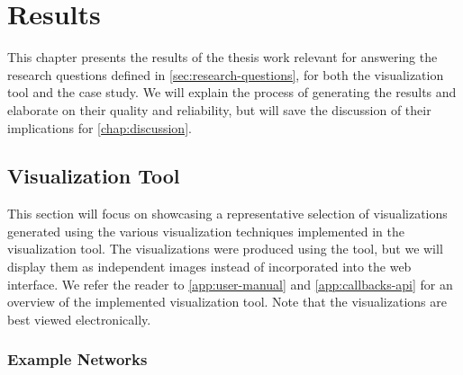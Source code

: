 
\chapter{Results} \label{chap:results}

This chapter presents the results of the thesis work relevant for answering the research questions defined in \autoref{sec:research-questions}, for both the visualization tool and the case study. We will explain the process of generating the results and elaborate on their quality and reliability, but will save the discussion of their implications for \autoref{chap:discussion}.

\section{Visualization Tool} \label{sec:visualization-tool-results}

This section will focus on showcasing a representative selection of visualizations generated using the various visualization techniques implemented in the visualization tool. The visualizations were produced using the tool, but we will display them as independent images instead of incorporated into the web interface. We refer the reader to \autoref{app:user-manual} and \autoref{app:callbacks-api} for an overview of the implemented visualization tool. Note that the visualizations are best viewed electronically.


\subsection{Example Networks} \label{sec:example-networks}

